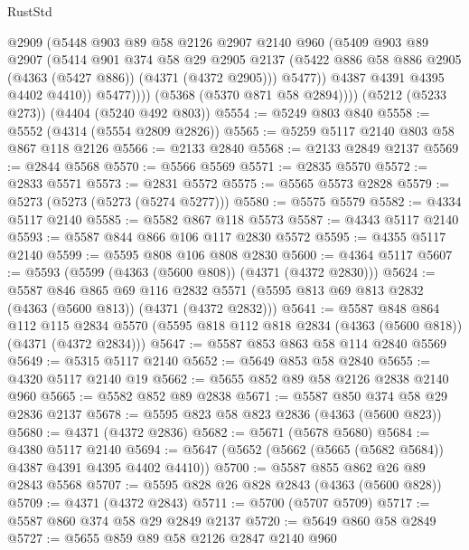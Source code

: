 \begin{lexlean}{RustStd}
\begin{coremodule}
{\begin{coremodule}
{{{{{{{{{{{{{{{{                  @2909
                  (@5448
                    @903
                    @89
                    @58
                    @2126
                    @2907
                    @2140
                    @960
                    (@5409
                      @903
                      @89
                      @2907
                      (@5414
                        @901
                        @374
                        @58
                        @29
                        @2905
                        @2137
                        (@5422 @886 @58 @886 @2905 (@4363 (@5427 @886)) (@4371 (@4372 @2905)))
                        @5477))
                    @4387
                    @4391
                    @4395
                    @4402
                    @4410))
                @5477))))
        (@5368 (@5370 @871 @58 @2894))))
    (@5212 (@5233 @273))
    (@4404 (@5240 @492 @803))
@5554 := @5249 @803 @840
@5558 := @5552 (@4314 (@5554 @2809 @2826))
@5565 := @5259 @5117 @2140 @803 @58 @867 @118 @2126
@5566 := @2133 @2840
@5568 := @2133 @2849 @2137
@5569 := @2844 @5568
@5570 := @5566 @5569
@5571 := @2835 @5570
@5572 := @2833 @5571
@5573 := @2831 @5572
@5575 := @5565 @5573 @2828
@5579 := @5273 (@5273 (@5273 (@5274 @5277)))
@5580 := @5575 @5579
@5582 := @4334 @5117 @2140
@5585 := @5582 @867 @118 @5573
@5587 := @4343 @5117 @2140
@5593 := @5587 @844 @866 @106 @117 @2830 @5572
@5595 := @4355 @5117 @2140
@5599 := @5595 @808 @106 @808 @2830
@5600 := @4364 @5117
@5607 := @5593 (@5599 (@4363 (@5600 @808)) (@4371 (@4372 @2830)))
@5624 := @5587
    @846
    @865
    @69
    @116
    @2832
    @5571
    (@5595 @813 @69 @813 @2832 (@4363 (@5600 @813)) (@4371 (@4372 @2832)))
@5641 := @5587
    @848
    @864
    @112
    @115
    @2834
    @5570
    (@5595 @818 @112 @818 @2834 (@4363 (@5600 @818)) (@4371 (@4372 @2834)))
@5647 := @5587 @853 @863 @58 @114 @2840 @5569
@5649 := @5315 @5117 @2140
@5652 := @5649 @853 @58 @2840
@5655 := @4320 @5117 @2140 @19
@5662 := @5655 @852 @89 @58 @2126 @2838 @2140 @960
@5665 := @5582 @852 @89 @2838
@5671 := @5587 @850 @374 @58 @29 @2836 @2137
@5678 := @5595 @823 @58 @823 @2836 (@4363 (@5600 @823))
@5680 := @4371 (@4372 @2836)
@5682 := @5671 (@5678 @5680)
@5684 := @4380 @5117 @2140
@5694 := @5647 (@5652 (@5662 (@5665 (@5682 @5684)) @4387 @4391 @4395 @4402 @4410))
@5700 := @5587 @855 @862 @26 @89 @2843 @5568
@5707 := @5595 @828 @26 @828 @2843 (@4363 (@5600 @828))
@5709 := @4371 (@4372 @2843)
@5711 := @5700 (@5707 @5709)
@5717 := @5587 @860 @374 @58 @29 @2849 @2137
@5720 := @5649 @860 @58 @2849
@5727 := @5655 @859 @89 @58 @2126 @2847 @2140 @960
}}}}}}}}}}}}}}}}
\end{coremodule}}
\end{coremodule}
\end{lexlean}
